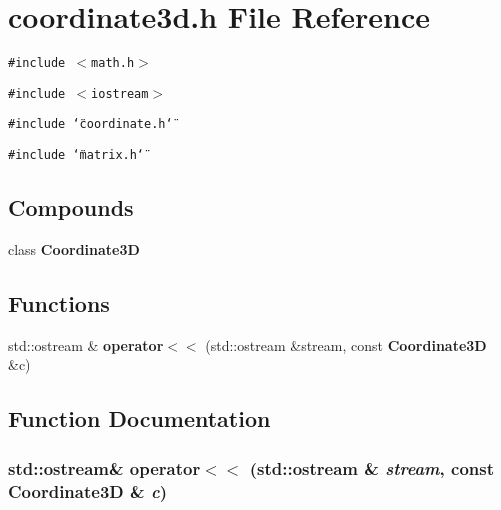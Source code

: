 \section{coordinate3d.h File Reference}
\label{coordinate3d_8h}
{\tt \#include $<$math.h$>$}\par
{\tt \#include $<$iostream$>$}\par
{\tt \#include \char`\"{}coordinate.h\char`\"{}}\par
{\tt \#include \char`\"{}matrix.h\char`\"{}}\par
\subsection*{Compounds}
\begin{CompactItemize}
\item 
class {\bf Coordinate3D}
\end{CompactItemize}
\subsection*{Functions}
\begin{CompactItemize}
\item 
std::ostream \& {\bf operator$<$$<$} (std::ostream \&stream, const {\bf Coordinate3D} \&c)
\end{CompactItemize}


\subsection{Function Documentation}
\subsubsection{\setlength{\rightskip}{0pt plus 5cm}std::ostream\& operator$<$$<$ (std::ostream \& {\em stream}, const {\bf Coordinate3D} \& {\em c})\hspace{0.3cm}{\tt  [inline]}}\label{coordinate3d_8h_a0}



